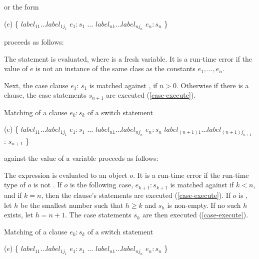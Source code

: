 \documentclass[makeidx]{article}
\begin{document}
{or the form

\begin{normativeDartCode}
\SWITCH{} ($e$) \{
   $label_{11} \ldots label_{1j_1}$ \CASE{} $e_1: s_1$
   $\ldots$
   $label_{n1} \ldots label_{nj_n}$ \CASE{} $e_n: s_n$
\}
\end{normativeDartCode}

proceeds as follows:

\LMHash{}%
The statement  is evaluated, where \id{} is a fresh variable.
It is a run-time error if the value of $e$ is
not an instance of the same class as the constants $e_1, \ldots, e_n$.


\LMHash{}%
Next, the case clause \CASE{} $e_{1}$: $s_{1}$ is matched against \id, if $n > 0$.
Otherwise if there is a \DEFAULT{} clause, the case statements $s_{n+1}$ are executed (\ref{case-execute}).

\LMHash{}%
Matching of a \CASE{} clause \CASE{} $e_{k}: s_{k}$ of a switch statement

\begin{normativeDartCode}
\SWITCH{} ($e$) \{
   $label_{11} \ldots label_{1j_1}$ \CASE{} $e_1: s_1$
   $\ldots$
   $label_{n1} \ldots label_{nj_n}$ \CASE{} $e_n: s_n$
   $label_{(n+1)1} \ldots label_{(n+1)j_{n+1}}$ \DEFAULT{}: $s_{n+1}$
\}
\end{normativeDartCode}

against the value of a variable \id{} proceeds as follows:

\LMHash{}%
The expression  is evaluated to an object $o$.
It is a run-time error if the run-time type of $o$ is not .
If $o$ is \FALSE{} the following case, \CASE{} $e_{k+1}: s_{k+1}$ is matched against \id{} if $k < n$, and if $k = n$, then the \DEFAULT{} clause's statements are executed (\ref{case-execute}).
If $o$ is \TRUE{}, let $h$ be the smallest number such that $h \ge k$ and $s_h$ is non-empty.
If no such $h$ exists, let $h = n + 1$.
The case statements $s_h$ are then executed (\ref{case-execute}).

\LMHash{}%
Matching of a \CASE{} clause \CASE{} $e_{k}: s_{k}$ of a switch statement

\begin{normativeDartCode}
\SWITCH{} ($e$) \{
   $label_{11} \ldots label_{1j_1}$ \CASE{} $e_1: s_1$
   $\ldots$
   $label_{n1} \ldots label_{nj_n}$ \CASE{} $e_n: s_n$
\}
\end{normativeDartCode}

}
\end{document}
